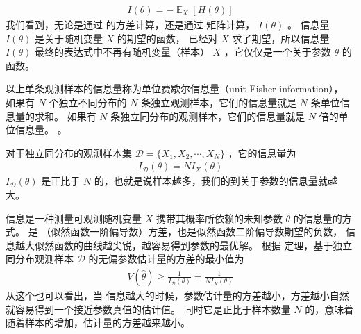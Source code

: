 \documentclass[letterpaper,10pt,english]{sphinxmanual}
\begin{document}
\begin{equation}\label{equation:推断与检验/content:eq_34_41}
\begin{split}I(\theta) = - \mathop{\mathbb{E}}_{X}[H(\theta)]\end{split}
\end{equation}
我们看到，无论是通过  的方差计算，还是通过  矩阵计算，
\(I(\theta)\) 。
信息量 \(I(\theta)\) 是关于随机变量 \(X\) 的期望的函数，
已经对 \(X\) 求了期望，所以信息量 \(I(\theta)\) 最终的表达式中不再有随机变量（样本） \(X\)
，它仅仅是一个关于参数 \(\theta\) 的函数。

以上单条观测样本的信息量称为单位费歇尔信息量（unit Fisher information），
如果有 \(N\) 个独立不同分布的 \(N\) 条独立观测样本，它们的信息量就是 \(N\) 条单位信息量的求和。
如果有 \(N\) 条独立同分布的观测样本，它们的信息量就是 \(N\) 倍的单位信息量。
。

对于独立同分布的观测样本集 \(\mathcal{D}=\{X_1,X_2,\cdots,X_N\}\)
，它的信息量为
\begin{equation}\label{equation:推断与检验/content:推断与检验/content:61}
\begin{split}I_{\mathcal{D}}(\theta) = N I_{X}(\theta)\end{split}
\end{equation}
\(I_{\mathcal{D}}(\theta)\) 是正比于 \(N\) 的，也就是说样本越多，我们的到关于参数的信息量就越大。

 信息是一种测量可观测随机变量 \(X\) 携带其概率所依赖的未知参数 \(\theta\) 的信息量的方式。
 是  （似然函数一阶偏导数）方差，也是似然函数二阶偏导数期望的负数，
 信息越大似然函数的曲线越尖锐，越容易得到参数的最优解。
根据  定理，基于独立同分布观测样本 \(\mathcal{D}\) 的无偏参数估计量的方差的最小值为
\begin{equation}\label{equation:推断与检验/content:推断与检验/content:62}
\begin{split}V(\hat{\theta}) \geq \frac{1}{  I_{\mathcal{D}} (\theta)} = \frac{1}{ N I_{X} (\theta)}\end{split}
\end{equation}
从这个也可以看出，当  信息越大的时候，参数估计量的方差越小，方差越小自然就容易得到一个接近参数真值的估计值。
同时它是正比于样本数量 \(N\) 的，意味着随着样本的增加，估计量的方差越来越小。
\end{document}
